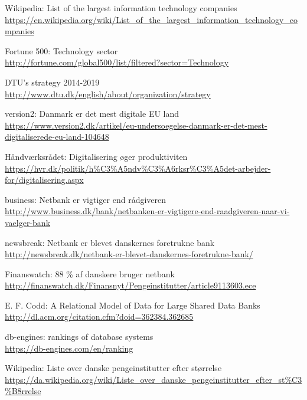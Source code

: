 \begin{thebibliography}{9}

Wikipedia: List of the largest information technology companies \\
\url{https://en.wikipedia.org/wiki/List_of_the_largest_information_technology_companies}

Fortune 500: Technology sector\\
\url{http://fortune.com/global500/list/filtered?sector=Technology}

DTU's strategy 2014-2019 \\
\url{http://www.dtu.dk/english/about/organization/strategy}

version2: Danmark er det mest digitale EU land \\
\url{https://www.version2.dk/artikel/eu-undersoegelse-danmark-er-det-mest-digitaliserede-eu-land-104648}

 Håndværksrådet: Digitalisering øger produktiviten \\
\url{https://hvr.dk/politik/h\%C3\%A5ndv\%C3\%A6rksr\%C3\%A5det-arbejder-for/digitalisering.aspx}

business: Netbank er vigtiger end rådgiveren \\
\url{http://www.business.dk/bank/netbanken-er-vigtigere-end-raadgiveren-naar-vi-vaelger-bank}

newsbreak: Netbank er blevet danskernes foretrukne bank \\
\url{http://newsbreak.dk/netbank-er-blevet-danskernes-foretrukne-bank/}

Finanswatch: 88 \% af danskere bruger netbank \\
\url{http://finanswatch.dk/Finansnyt/Pengeinstitutter/article9113603.ece}

E. F. Codd: A Relational Model of Data for Large Shared Data Banks \\
\url{http://dl.acm.org/citation.cfm?doid=362384.362685}

db-engines: rankings of database systems \\
\url{https://db-engines.com/en/ranking}

Wikipedia: Liste over danske pengeinstitutter efter størrelse \\
\url{https://da.wikipedia.org/wiki/Liste\_over\_danske\_pengeinstitutter\_efter\_st\%C3\%B8rrelse}


\end{thebibliography}
